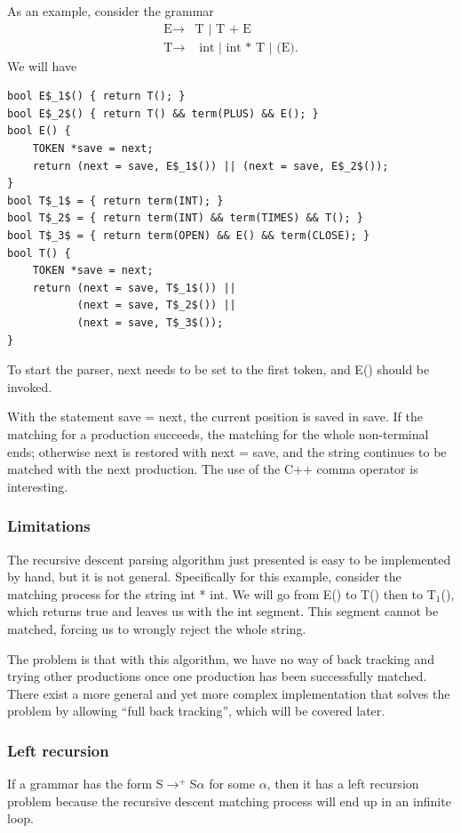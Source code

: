 As an example, consider the grammar 
\begin{equation}\label{favgrammar}\begin{split}
\text{E}\rightarrow&\text{T }|\text{ T + E }\\\text{T}\rightarrow&\text{ int }|\text{ int * T }|\text{ (E).}
\end{split}\end{equation}
We will have
\begin{lstlisting}[mathescape]
bool E$_1$() { return T(); }
bool E$_2$() { return T() && term(PLUS) && E(); }
bool E() {
	TOKEN *save = next;
	return (next = save, E$_1$()) || (next = save, E$_2$());
}
bool T$_1$ = { return term(INT); }
bool T$_2$ = { return term(INT) && term(TIMES) && T(); }
bool T$_3$ = { return term(OPEN) && E() && term(CLOSE); }
bool T() {
	TOKEN *save = next;
	return (next = save, T$_1$()) || 
		   (next = save, T$_2$()) || 
		   (next = save, T$_3$());
}
\end{lstlisting}
To start the parser, {\sf next} needs to be set to the first token, and E() should be invoked. 

With the statement {\sf *save = next}, the current position is saved in {\sf save}. If the matching for a production succeeds, the matching for the whole non-terminal ends; otherwise {\sf next} is restored with {\sf next = save}, and the string continues to be matched with the next production. The use of the C++ comma operator is interesting.
\subsubsection{Limitations}
The recursive descent parsing algorithm just presented is easy to be implemented by hand, but it is not general. Specifically for this example, consider the matching process for the string {\sf int * int}. We will go from E() to T() then to T$_1$(), which returns true and leaves us with the {\sf * int} segment. This segment cannot be matched, forcing us to wrongly reject the whole string. 

The problem is that with this algorithm, we have no way of back tracking and trying other productions once one production has been successfully matched. There exist a more general and yet more complex implementation that solves the problem by allowing ``full back tracking'', which will be covered later.
\subsubsection{Left recursion}
If a grammar has the form S$\rightarrow^+$S$\alpha$ for some $\alpha$, then it has a left recursion problem because the recursive descent matching process will end up in an infinite loop.

